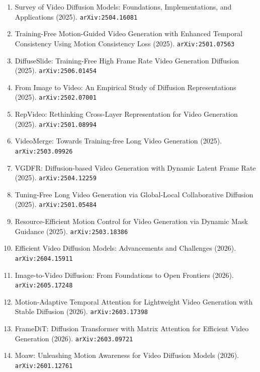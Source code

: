 \documentclass[11pt]{article}
\begin{document}
\begin{enumerate}
  \item Survey of Video Diffusion Models: Foundations, Implementations, and Applications (2025). \texttt{arXiv:2504.16081}
  \item Training-Free Motion-Guided Video Generation with Enhanced Temporal
  Consistency Using Motion Consistency Loss (2025). \texttt{arXiv:2501.07563}
  \item DiffuseSlide: Training-Free High Frame Rate Video Generation Diffusion (2025). \texttt{arXiv:2506.01454}
  \item From Image to Video: An Empirical Study of Diffusion Representations (2025). \texttt{arXiv:2502.07001}
  \item RepVideo: Rethinking Cross-Layer Representation for Video Generation (2025). \texttt{arXiv:2501.08994}
  \item VideoMerge: Towards Training-free Long Video Generation (2025). \texttt{arXiv:2503.09926}
  \item VGDFR: Diffusion-based Video Generation with Dynamic Latent Frame Rate (2025). \texttt{arXiv:2504.12259}
  \item Tuning-Free Long Video Generation via Global-Local Collaborative
  Diffusion (2025). \texttt{arXiv:2501.05484}
  \item Resource-Efficient Motion Control for Video Generation via Dynamic Mask
  Guidance (2025). \texttt{arXiv:2503.18386}
  \item Efficient Video Diffusion Models: Advancements and Challenges (2026). \texttt{arXiv:2604.15911}
  \item Image-to-Video Diffusion: From Foundations to Open Frontiers (2026). \texttt{arXiv:2605.17248}
  \item Motion-Adaptive Temporal Attention for Lightweight Video Generation with Stable Diffusion (2026). \texttt{arXiv:2603.17398}
  \item FrameDiT: Diffusion Transformer with Matrix Attention for Efficient Video Generation (2026). \texttt{arXiv:2603.09721}
  \item Moaw: Unleashing Motion Awareness for Video Diffusion Models (2026). \texttt{arXiv:2601.12761}
\end{enumerate}
\end{document}
